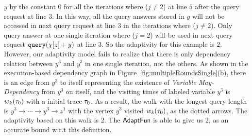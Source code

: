 \begin{example}
{    $y$ by the constant $0$ for all the iterations where ($j \neq 2$) at line $5$ after the 
    query request at line $3$.
    In this way, all the query answers stored in $y$ will not be accessed in next query request at line $3$ in the iterations 
    where  ($j \neq 2$).
    Only query answer at one single iteration where ($j = 2 $) will be used in next query request
    ${\tt query}(\chi[z] + y)$ at line $3$.
    So the adaptivity for this example is $2$. 
    However, our adaptivity model fails to realize that there is only dependency relation 
    between $y^3$ and $y^3$ in one single iteration, 
    not the others. 
    As shown in the execution-based dependency graph in Figure~\ref{fig:multipleRoundsSingle}(b), 
    there is an edge from $y^3$ to itself representing the existence of \emph{Variable May-Dependency} from $y^3$ on itself,
    and the visiting times of labeled variable $y^3$ is 
    $w_k(\mathtt{\tau}_0)$ with a initial trace $\mathtt{\tau}_0$. 
    As a result, the walk with the longest query length 
    is
    $y^3  \to \cdots \to y^3 \to z^1 $ with the vertex $y^3$ visited $w_k(\mathtt{\tau}_0)$,
    as the dotted arrows. 
    The adaptivity 
    based on
    this walk
    is $2$.
    The $\textsf{AdaptFun}$ is able to give us $2$,  as an accurate bound w.r.t this definition.}
        \begin{figure}
     \centering
    \quad
    \begin{subfigure}{.35\textwidth}
\end{subfigure}
\end{figure}
\end{example}
